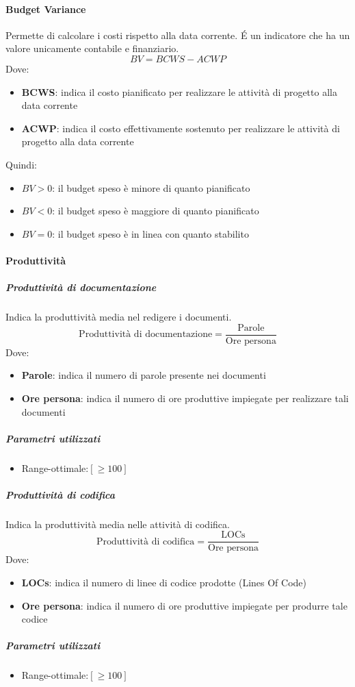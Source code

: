 \paragraph{Budget Variance}
Permette di calcolare i costi rispetto alla data corrente. \'E un indicatore che ha un valore
unicamente contabile e finanziario.
$$
BV = BCWS − ACWP
$$
Dove:
\begin{itemize}
\item \textbf{BCWS}: indica il costo pianificato per realizzare le attività di progetto alla data corrente
\item \textbf{ACWP}: indica il costo effettivamente sostenuto per realizzare le attività di progetto alla
  data corrente
\end{itemize}
Quindi:
\begin{itemize}
\item $BV>0$: il budget speso è minore di quanto pianificato
\item $BV<0$: il budget speso è maggiore di quanto pianificato
\item $BV=0$: il budget speso è in linea con quanto stabilito
\end{itemize}

\paragraph{Produttività}

\subparagraph{Produttività di documentazione}
Indica la produttività media nel redigere i documenti.
$$
\text{Produttività di documentazione} = \frac{\text{Parole}}{\text{Ore persona}}
$$
Dove:
\begin{itemize}
\item \textbf{Parole}: indica il numero di parole presente nei documenti
\item \textbf{Ore persona}: indica il numero di ore produttive impiegate per
  realizzare tali documenti
\end{itemize}

\subparagraph{Parametri utilizzati}
\begin{itemize}
\item Range-ottimale:$ [≥100]$
\end{itemize}



\subparagraph{Produttività di codifica}
Indica la produttività media nelle attività di codifica.
$$
\text{Produttività di codifica} = \frac{\text{LOCs}}{\text{Ore persona}}
$$
Dove:
\begin{itemize}
\item \textbf{LOCs}: indica il numero di linee di codice prodotte
  (Lines Of Code)
\item \textbf{Ore persona}: indica il numero di ore produttive
  impiegate per produrre tale codice
\end{itemize}
\subparagraph{Parametri utilizzati}
\begin{itemize}
	\item Range-ottimale:$ [≥100]$
\end{itemize}



